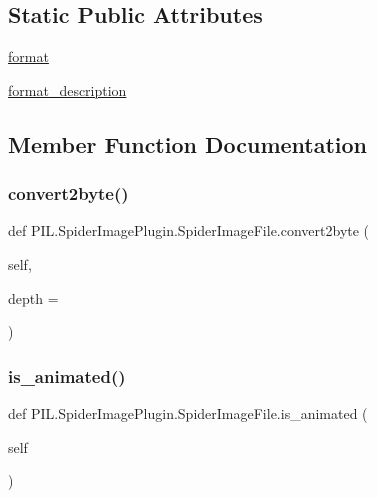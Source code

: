 \subsection*{Static Public Attributes}
\begin{DoxyCompactItemize}
\item 
\hyperlink{classPIL_1_1SpiderImagePlugin_1_1SpiderImageFile_a02c39c3fb85d3ed7f9bb7a0a8a414e49}{format}
\item 
\hyperlink{classPIL_1_1SpiderImagePlugin_1_1SpiderImageFile_a5bfca32a64961589f45bf5c99ea1f225}{format\+\_\+description}
\end{DoxyCompactItemize}


\subsection{Member Function Documentation}
\mbox{\label{classPIL_1_1SpiderImagePlugin_1_1SpiderImageFile_ad14fe099c275cec444b6c1c9799d6238}} 
\subsubsection{\texorpdfstring{convert2byte()}{convert2byte()}}
{\footnotesize\ttfamily def P\+I\+L.\+Spider\+Image\+Plugin.\+Spider\+Image\+File.\+convert2byte (\begin{DoxyParamCaption}\item[{}]{self,  }\item[{}]{depth = {} }\end{DoxyParamCaption})}

\mbox{\label{classPIL_1_1SpiderImagePlugin_1_1SpiderImageFile_a98bc59f89c641cbe0b6d101128954e6e}} 
\subsubsection{\texorpdfstring{is\+\_\+animated()}{is\_animated()}}
{\footnotesize\ttfamily def P\+I\+L.\+Spider\+Image\+Plugin.\+Spider\+Image\+File.\+is\+\_\+animated (\begin{DoxyParamCaption}\item[{}]{self }\end{DoxyParamCaption})}

